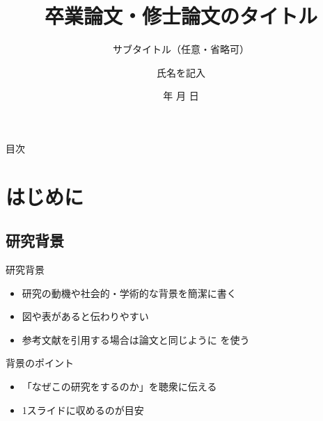 \documentclass[uplatex,dvipdfmx,aspectratio=169]{beamer}
\title[卒論・修論発表]{卒業論文・修士論文のタイトル}
\subtitle{サブタイトル（任意・省略可）}
\author{氏名を記入}
\institute{福井大学 工学部 機械・システム工学科 機械工学コース}
\date{\number\year 年 \number\month 月 \number\day 日}  %
\begin{document}
\begin{frame}[plain]
  \titlepage
\end{frame}

\begin{frame}{目次}
  \tableofcontents
\end{frame}

\section{はじめに}

\subsection{研究背景}
\begin{frame}{研究背景}
  \begin{itemize}
    \item 研究の動機や社会的・学術的な背景を簡潔に書く
    \item 図や表があると伝わりやすい
    \item 参考文献を引用する場合は論文と同じように \cite{ref1} を使う
  \end{itemize}
  \begin{block}{背景のポイント}
    \begin{itemize}
      \item 「なぜこの研究をするのか」を聴衆に伝える
      \item 1スライドに収めるのが目安
    \end{itemize}
  \end{block}
\end{frame}
\end{document}
